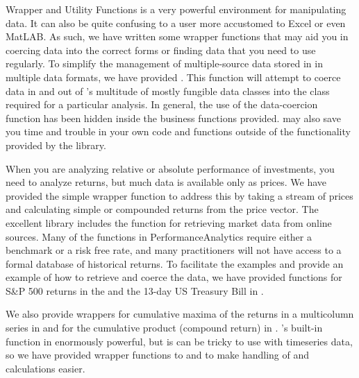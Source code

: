 \documentclass[12pt,letterpaper,english]{article}
\begin{document}
\begin{Section}{Wrapper and Utility Functions}
\R{} is a very powerful environment for manipulating data.  It can also be quite confusing to a user more accustomed to Excel or even MatLAB.  As such, we have written some wrapper functions that may aid you in coercing data into the correct forms or finding data that you need to use regularly.  To simplify the management of multiple-source data stored in \R{} in multiple data formats, we have provided .  This function will attempt to coerce data in and out of \R's multitude of mostly fungible data classes into the class required for a particular analysis.  In general, the use of the data-coercion function has been hidden inside the business functions provided.   may also save you time and trouble in your own code and functions outside of the functionality provided by the  library.

When you are analyzing relative or absolute performance of investments, you need to analyze returns, but much data is available only as prices.  We have provided the simple wrapper function  to address this by taking a stream of prices and calculating simple or compounded returns from the price vector. The excellent  library includes the function  for retrieving market data from online sources.  Many of the functions in PerformanceAnalytics require either a benchmark or a risk free rate, and many practitioners will not have access to a formal database of historical returns.  To facilitate the examples and provide an example of how to retrieve and coerce the data, we have provided functions for S\&P 500 returns in the  and the 13-day US Treasury Bill in .

We also provide wrappers for cumulative maxima of the returns in a multicolumn series in  and for the cumulative product (compound return) in .   \R's built-in  function in enormously powerful, but is can be tricky to use with timeseries data, so we have provided wrapper functions to  and  to make handling of  and  calculations easier.
\end{Section}
\end{document}
